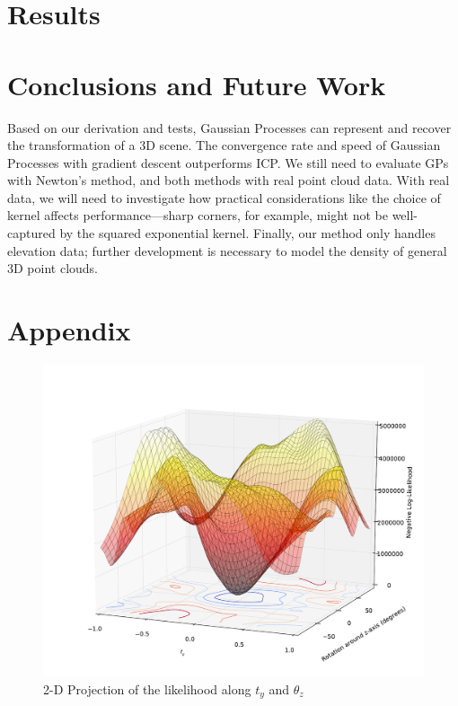 \documentclass{article} %
\begin{document}
\section{Results}

\section{Conclusions and Future Work}
Based on our derivation and tests, Gaussian Processes can represent and recover the transformation of a 3D scene. The convergence rate and speed of Gaussian Processes with gradient descent outperforms ICP. We still need to evaluate GPs with Newton's method, and both methods with real point cloud data. With real data, we will need to investigate how practical considerations like the choice of kernel affects performance---sharp corners, for example, might not be well-captured by the squared exponential kernel.
Finally, our method only handles elevation data; further development is necessary to model the density of general 3D point clouds. 




\section{Appendix}

\begin{figure}
\includegraphics[width=7in]{LLmap3.pdf}
\caption{2-D Projection of the likelihood along $t_y$ and $\theta_z$}
\label{figure:likelihood}
\end{figure}
\end{document}
